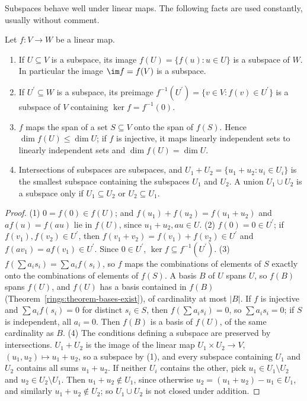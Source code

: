 Subspaces behave well under linear maps. The following facts are used constantly, usually without comment.

\begin{lemma}\label{linear-algebra:lemma-images-subspaces}
Let $f \colon V \to W$ be a linear map.
\begin{enumerate}
\item If $U \subseteq V$ is a subspace, its image $f(U) = \{f(u) : u \in U\}$ is a subspace of $W$. In particular the image $\im f = f(V)$ is a subspace.
\item If $U^{\prime} \subseteq W$ is a subspace, its preimage $f^{-1}(U^{\prime}) = \{v \in V : f(v) \in U^{\prime}\}$ is a subspace of $V$ containing $\ker f = f^{-1}(0)$.
\item $f$ maps the span of a set $S \subseteq V$ onto the span of $f(S)$. Hence $\dim f(U) \leq \dim U$; if $f$ is injective, it maps linearly independent sets to linearly independent sets and $\dim f(U) = \dim U$.
\item Intersections of subspaces are subspaces, and $U_1 + U_2 = \{u_1 + u_2 : u_i \in U_i\}$ is the smallest subspace containing the subspaces $U_1$ and $U_2$. A union $U_1 \cup U_2$ is a subspace only if
$U_1 \subseteq U_2$ or $U_2 \subseteq U_1$.
\end{enumerate}
\end{lemma}

\begin{proof}
(1) $0 = f(0) \in f(U)$; and $f(u_1) + f(u_2) = f(u_1 + u_2)$ and $af(u) = f(au)$ lie in $f(U)$, since $u_1 + u_2, au \in U$. (2) $f(0) = 0 \in U^{\prime}$; if $f(v_1), f(v_2) \in U^{\prime}$, then
$f(v_1 + v_2) = f(v_1) + f(v_2) \in U^{\prime}$ and $f(av_1) = af(v_1) \in U^{\prime}$. Since $0 \in U^{\prime}$, $\ker f \subseteq f^{-1}(U^{\prime})$.
(3) $f(\sum a_is_i) = \sum a_if(s_i)$, so $f$ maps the combinations of elements of $S$ exactly onto the combinations of elements of $f(S)$. A basis $B$ of $U$ spans $U$, so $f(B)$ spans $f(U)$, and $f(U)$
has a basis contained in $f(B)$ (Theorem~\ref{rings:theorem-bases-exist}), of cardinality at most $|B|$. If $f$ is injective and $\sum a_if(s_i) = 0$ for distinct $s_i \in S$, then $f(\sum a_is_i) = 0$, so
$\sum a_is_i = 0$; if $S$ is independent, all $a_i = 0$. Then $f(B)$ is a basis of $f(U)$, of the same cardinality as $B$.
(4) The conditions defining a subspace are preserved by intersections. $U_1 + U_2$ is the image of the linear map $U_1 \times U_2 \to V$, $(u_1, u_2) \mapsto u_1 + u_2$, so a subspace by (1), and every subspace
containing $U_1$ and $U_2$ contains all sums $u_1 + u_2$. If neither $U_i$ contains the other, pick $u_1 \in U_1 \setminus U_2$ and $u_2 \in U_2 \setminus U_1$. Then $u_1 + u_2 \notin U_1$, since otherwise
$u_2 = (u_1 + u_2) - u_1 \in U_1$, and similarly $u_1 + u_2 \notin U_2$; so $U_1 \cup U_2$ is not closed under addition.
\end{proof}

